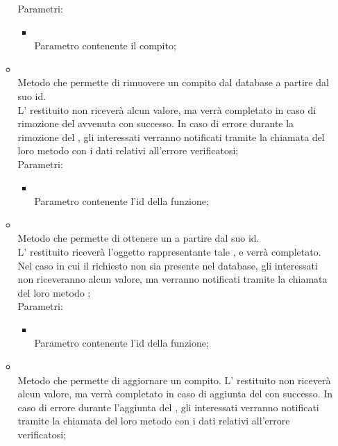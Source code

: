 \begin{itemize}
\begin{itemize}
		Parametri:
		\begin{itemize}
			\item {} \\
			Parametro contenente il compito;
		\end{itemize}
		\item[]  \\		Metodo che permette di rimuovere un compito dal database a partire dal suo id. \\ L' restituito non riceverà alcun valore, ma verrà completato in caso di rimozione del  avvenuta con successo. In caso di errore durante la rimozione del , gli  interessati verranno notificati tramite la chiamata del loro metodo  con i dati relativi all'errore verificatosi;\\
		Parametri:
		\begin{itemize}
			\item {} \\
			Parametro contenente l'id della funzione;
		\end{itemize}
		\item[]  \\		Metodo che permette di ottenere un  a partire dal suo id. \\ L' restituito riceverà l'oggetto rappresentante tale , e verrà completato. Nel caso in cui il  richiesto non sia presente nel database, gli  interessati non riceveranno alcun valore, ma verranno notificati tramite la chiamata del loro metodo ;\\
		Parametri:
		\begin{itemize}
			\item {} \\
			Parametro contenente l'id della funzione;
		\end{itemize}
		\item[]  \\		Metodo che permette di aggiornare un compito. L' restituito non riceverà alcun valore, ma verrà completato in caso di aggiunta del  con successo. In caso di errore durante l'aggiunta del , gli  interessati verranno notificati tramite la chiamata del loro metodo  con i dati relativi all'errore verificatosi;\\

\end{itemize}
\end{itemize}
